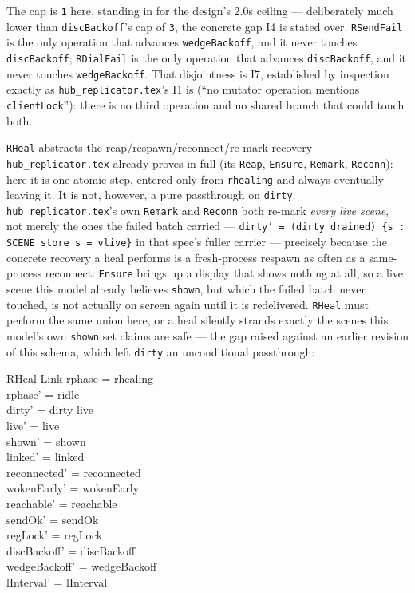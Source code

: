 \documentclass[a4paper,10pt,fleqn]{article}
\begin{document}
The cap is \texttt{1} here, standing in for the design's 2.0s ceiling ---
deliberately much lower than \texttt{discBackoff}'s cap of \texttt{3}, the
concrete gap I4 is stated over.  \texttt{RSendFail} is the only operation
that advances \texttt{wedgeBackoff}, and it never touches
\texttt{discBackoff}; \texttt{RDialFail} is the only operation that
advances \texttt{discBackoff}, and it never touches \texttt{wedgeBackoff}.
That disjointness is I7, established by inspection exactly as
\texttt{hub\_replicator.tex}'s I1 is (``no mutator operation mentions
\texttt{clientLock}''): there is no third operation and no shared branch
that could touch both.

\texttt{RHeal} abstracts the reap/respawn/reconnect/re-mark recovery
\texttt{hub\_replicator.tex} already proves in full (its \texttt{Reap},
\texttt{Ensure}, \texttt{Remark}, \texttt{Reconn}): here it is one atomic
step, entered only from \texttt{rhealing} and always eventually leaving
it.  It is not, however, a pure passthrough on \texttt{dirty}.
\texttt{hub\_replicator.tex}'s own \texttt{Remark} and \texttt{Reconn}
both re-mark \emph{every live scene}, not merely the ones the failed
batch carried --- \texttt{dirty' = (dirty \cup drained) \cup \{s : SCENE
\mid store~s = vlive\}} in that spec's fuller carrier --- precisely
because the concrete recovery a heal performs is a fresh-process respawn
as often as a same-process reconnect: \texttt{Ensure} brings up a display
that shows nothing at all, so a live scene this model already believes
\texttt{shown}, but which the failed batch never touched, is not actually
on screen again until it is redelivered.  \texttt{RHeal} must perform the
same union here, or a heal silently strands exactly the scenes this
model's own \texttt{shown} set claims are safe --- the gap raised against
an earlier revision of this schema, which left \texttt{dirty} an
unconditional passthrough:

\begin{schema}{RHeal}
  \Delta Link
\where
  rphase = rhealing \\
  rphase' = ridle \\
  dirty' = dirty \cup live \\
  live' = live \\ shown' = shown \\ linked' = linked \\
  reconnected' = reconnected \\ wokenEarly' = wokenEarly \\
  reachable' = reachable \\ sendOk' = sendOk \\ regLock' = regLock \\
  discBackoff' = discBackoff \\ wedgeBackoff' = wedgeBackoff \\
  lInterval' = lInterval
\end{schema}
\end{document}
